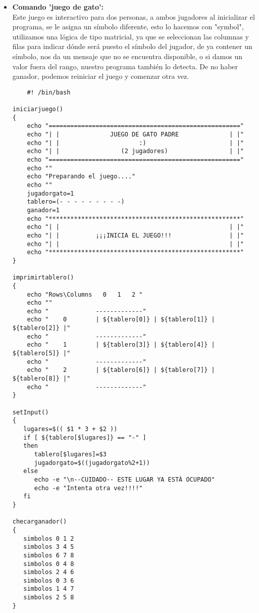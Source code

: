\documentclass[letterpaper,12pt]{article} %
\begin{document}
\begin{itemize}
     \item \textbf{Comando 'juego de gato':} \\
    Este juego es interactivo para dos personas, a ambos jugadores al inicializar el programa, se le asigna un símbolo diferente, esto lo hacemos con "symbol", utilizamos una lógica de tipo matricial, ya que se seleccionan las columnas y filas para indicar dónde será puesto el símbolo del jugador, de ya contener un símbolo, nos da un mensaje que no se encuentra disponible, o si damos un valor fuera del rango, nuestro programa también lo detecta. 
    De no haber ganador, podemos reiniciar el juego y comenzar otra vez. 
    
\begin{lstlisting}
    #! /bin/bash

iniciarjuego()
{
    echo "====================================================="
    echo "| |              JUEGO DE GATO PADRE              | |"
    echo "| |                      :)                       | |"
    echo "| |                 (2 jugadores)                 | |"
    echo "====================================================="
    echo ""
    echo "Preparando el juego...."
    echo ""
    jugadorgato=1
    tablero=(- - - - - - - - -)
    ganador=1
    echo "*****************************************************"
    echo "| |                                               | |"
    echo "| |          ¡¡¡INICIA EL JUEGO!!!                | |"
    echo "| |                                               | |"
    echo "*****************************************************"
}

imprimirtablero()
{
    echo "Rows\Columns   0   1   2 "
    echo ""
    echo "             -------------"
    echo "    0        | ${tablero[0]} | ${tablero[1]} | ${tablero[2]} |"
    echo "             -------------"
    echo "    1        | ${tablero[3]} | ${tablero[4]} | ${tablero[5]} |"
    echo "             -------------"
    echo "    2        | ${tablero[6]} | ${tablero[7]} | ${tablero[8]} |"
    echo "             -------------"   
}

setInput()
{
   lugares=$(( $1 * 3 + $2 ))
   if [ ${tablero[$lugares]} == "-" ]
   then 
      tablero[$lugares]=$3
      jugadorgato=$((jugadorgato%2+1))
   else
      echo -e "\n--CUIDADO-- ESTE LUGAR YA ESTÁ OCUPADO"
      echo -e "Intenta otra vez!!!!"
   fi
}

checarganador()
{
   simbolos 0 1 2
   simbolos 3 4 5
   simbolos 6 7 8
   simbolos 0 4 8
   simbolos 2 4 6
   simbolos 0 3 6
   simbolos 1 4 7
   simbolos 2 5 8
}


\end{lstlisting}
\end{itemize}
\end{document}
